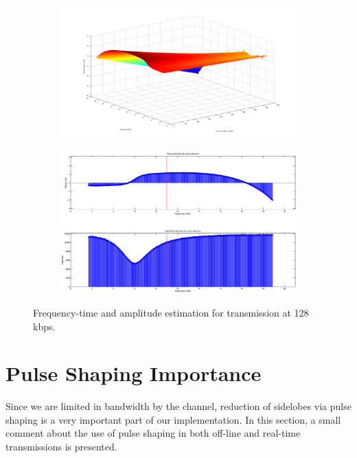 \documentclass[12pt,a4paper,openright]{report}
\begin{document}
	 \begin{figure}[H]
	 	 \centering
	    \begin{subfigure}{1\textwidth}
	 \centering
	    \includegraphics[width=1\textwidth]{surfplot.png}
	    \label{fig:surf}
	    \end{subfigure}
	    
	     \begin{subfigure}{1\textwidth}
	   	 \centering
	   	    \includegraphics[width=1\textwidth]{channel.eps}
	   	    \label{fig:25chan}
	   	    \end{subfigure}
	    \caption[Frequency-time and amplitude estimation for transmission at 128 kbps.]{Frequency-time and amplitude estimation for transmission at 128 kbps. }
	    \label{fig:OFDMlast2}
	\end{figure}

 \newpage
\section{Pulse Shaping Importance}
Since we are limited in bandwidth by the channel, reduction of sidelobes via pulse shaping is a very important part of our implementation. In this section, a small comment about the use of pulse shaping in both off-line and real-time transmissions is presented.
\end{document}
